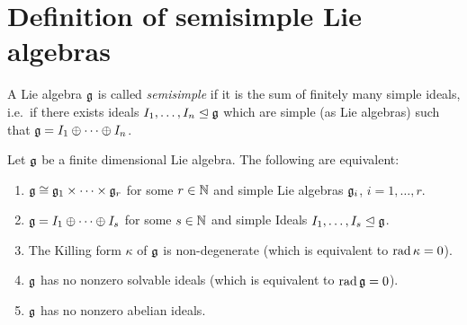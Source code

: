 \section{Definition of semisimple Lie algebras}


\begin{defi}
 A Lie algebra $\mathfrak{g}$ is called \emph{semisimple} if it is the sum of finitely many simple ideals, i.e.\ if there exists ideals $I_1, \dotsc, I_n \trianglelefteq \mathfrak{g}$ which are simple (as Lie algebras) such that $\mathfrak{g} = I_1 \oplus \dotsb \oplus I_n$.
\end{defi}



\begin{thrm}\label{thrm: characterisations of finite-dimensional semisimple Lie algebras}
 Let $\mathfrak{g}$ be a finite dimensional Lie algebra. The following are equivalent:
 \begin{enumerate}[leftmargin=*]
  \item\label{enum: definition semisimple Lie algebra product of simple Lie algebras}
   $\mathfrak{g} \cong \mathfrak{g}_1 \times \dotsb \times \mathfrak{g}_r$ for some $r \in \mathbb{N}$ and simple Lie algebras $\mathfrak{g}_i$, $i = 1, \dotsc, r$.
  \item\label{enum: definition semisimple Lie algebra sum of simple ideals}
   $\mathfrak{g} = I_1 \oplus \dotsb \oplus I_s$ for some $s \in \mathbb{N}$ and simple Ideals $I_1, \dotsc, I_s \trianglelefteq \mathfrak{g}$.
  \item\label{enum: definition semisimple Lie algebra killing form nondegenerate}
   The Killing form $\kappa$ of $\mathfrak{g}$ is non-degenerate (which is equivalent to $\operatorname{rad} \kappa = 0$).
  \item\label{enum: definition semisimple Lie algebra radical is zero}
   $\mathfrak{g}$ has no nonzero solvable ideals (which is equivalent to $\operatorname{rad} \mathfrak{g} = 0$).
  \item\label{enum: definition semisimple Lie algebra no nonzero abelian ideals}
   $\mathfrak{g}$ has no nonzero abelian ideals.
 \end{enumerate}
\end{thrm}
